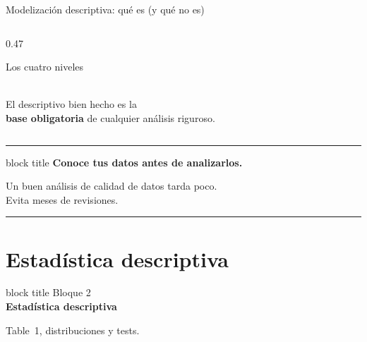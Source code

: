 \documentclass[aspectratio=169,10pt]{beamer}
\begin{document}
\begin{frame}{Modelización descriptiva: qué es (y qué no es)}
\begin{columns}[T]
\begin{column}{0.47\textwidth}
\begin{block}{Los cuatro niveles}
        \vspace{2mm}\\
        {\scriptsize El descriptivo bien hecho es la\\
        \textbf{base obligatoria} de cualquier análisis riguroso.}
      \end{block}
    \end{column}
  \end{columns}
\end{frame}

\begin{frame}
  \begin{center}
    \vspace{4mm}
    {\color{UCblue!30}\rule{\textwidth}{1.5pt}}
    \vspace{6mm}
    \begin{beamercolorbox}[sep=18pt,center,rounded=true,shadow=true]{block title}
      \LARGE\bfseries Conoce tus datos antes de analizarlos.
    \end{beamercolorbox}
    \vspace{6mm}
    {\Large Un buen análisis de calidad de datos tarda poco.}\\[4mm]
    {\Large Evita meses de revisiones.}
    \vspace{6mm}
    {\color{UCblue!30}\rule{\textwidth}{1.5pt}}
  \end{center}
\end{frame}


\section{Estadística descriptiva}

\begin{frame}[plain]
  \begin{center}
    \vspace{14mm}
    \begin{beamercolorbox}[sep=22pt,center,rounded=true,shadow=true]{block title}
      {\large Bloque 2}\\[4mm]
      \LARGE\bfseries Estadística descriptiva
    \end{beamercolorbox}
    \vspace{8mm}
    {\large\color{UCgray} Table~1, distribuciones y tests.}
  \end{center}
\end{frame}
\end{document}
